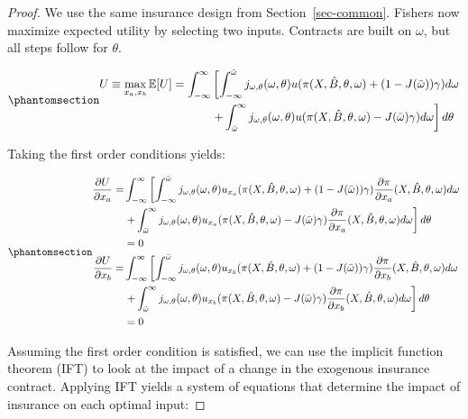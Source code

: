 \documentclass[
  letterpaper,
  DIV=11,
  numbers=noendperiod]{scrartcl}
\theoremstyle{plain}
\theoremstyle{plain}
\theoremstyle{remark}
\begin{document}
\begin{proof}
We use the same insurance design from Section~\ref{sec-common}. Fishers
now maximize expected utility by selecting two inputs. Contracts are
built on \(\omega\), but all steps follow for \(\theta\).

\begin{equation}\phantomsection\label{eq-max2}{
\begin{aligned}
U\equiv\max_{x_a,x_b}\mathbb{E}[U]=\int^{\infty}_{-\infty}&\left[ \int^{\bar \omega}_{-\infty}j_{\omega,\theta}(\omega,\theta)u(\pi(X,\hat{B},\theta,\omega)+(1-J(\bar \omega))\gamma)d\omega \right.\\
&\left.+\int^{\infty}_{\bar{\omega}}j_{\omega,\theta}(\omega,\theta) u(\pi(X,\hat{B},
\theta,\omega)-J(\bar \omega)\gamma)d\omega\right] d\theta
\end{aligned}
}\end{equation}

Taking the first order conditions yields:

\begin{equation}\phantomsection\label{eq-foc2}{
\begin{aligned}
\frac{\partial U}{\partial x_a}=&\int^{\infty}_{-\infty}\left[ \int^{\bar \omega}_{-\infty}j_{\omega,\theta}(\omega,\theta)u_{x_a}(\pi(X,\hat{B},\theta,\omega)+(1-J(\bar \omega))\gamma)\frac{\partial \pi}{\partial x_a}(X,\hat{B},\theta,\omega)d\omega\right.\\
&\left.+\int^{\infty}_{\bar{\omega}}j_{\omega,\theta}(\omega,\theta) u_{x_a}(\pi(X,\hat{B},\theta,\omega)-J(\bar \omega)\gamma)\frac{\partial \pi}{\partial x_a}(X,\hat{B},\theta,\omega)d\omega\right] d\theta\\
&=0\\
\frac{\partial U}{\partial x_b}=&\int^{\infty}_{-\infty}\left[ \int^{\bar \omega}_{-\infty}j_{\omega,\theta}(\omega,\theta)u_{x_b}(\pi(X,\hat{B},\theta,\omega)+(1-J(\bar \omega))\gamma)\frac{\partial \pi}{\partial x_b}(X,\hat{B},\theta,\omega)d\omega\right.\\
&\left.+\int^{\infty}_{\bar{\omega}}j_{\omega,\theta}(\omega,\theta) u_{x_b}(\pi(X,\hat{B},\theta,\omega)-J(\bar \omega)\gamma)\frac{\partial \pi}{\partial x_b}(X,\hat{B},\theta,\omega)d\omega\right] d\theta\\
&=0
\end{aligned}
}\end{equation}

Assuming the first order condition is satisfied, we can use the implicit
function theorem (IFT) to look at the impact of a change in the
exogenous insurance contract. Applying IFT yields a system of equations
that determine the impact of insurance on each optimal input:


\end{proof}
\end{document}
